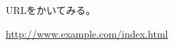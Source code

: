 \documentclass{jsarticle}
\begin{document}
URLをかいてみる。

\url{http://www.example.com/index.html}
\end{document}
